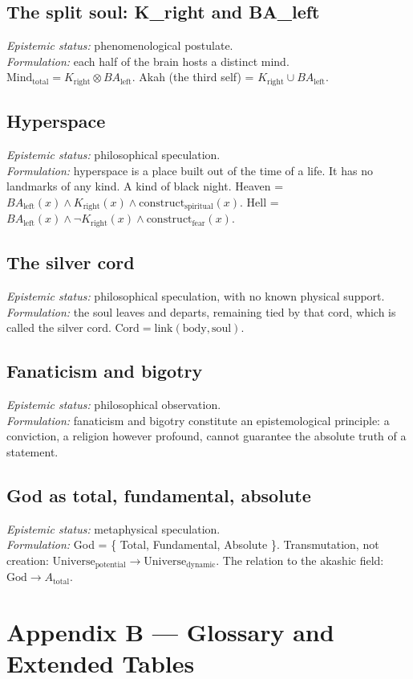 \subsection{The split soul: K\_right and BA\_left}
\textit{Epistemic status:} phenomenological postulate. \\
\textit{Formulation:} each half of the brain hosts a distinct mind. $\text{Mind}_{\text{total}} = K_{\text{right}} \otimes BA_{\text{left}}$. Akah (the third self) = $K_{\text{right}} \cup BA_{\text{left}}$.

\subsection{Hyperspace}
\textit{Epistemic status:} philosophical speculation. \\
\textit{Formulation:} hyperspace is a place built out of the time of a life. It has no landmarks of any kind. A kind of black night. Heaven = $BA_{\text{left}}(x) \land K_{\text{right}}(x) \land \text{construct}_{\text{spiritual}}(x)$. Hell = $BA_{\text{left}}(x) \land \neg K_{\text{right}}(x) \land \text{construct}_{\text{fear}}(x)$.

\subsection{The silver cord}
\textit{Epistemic status:} philosophical speculation, with no known physical support. \\
\textit{Formulation:} the soul leaves and departs, remaining tied by that cord, which is called the silver cord. $\text{Cord} = \text{link}(\text{body}, \text{soul})$.

\subsection{Fanaticism and bigotry}
\textit{Epistemic status:} philosophical observation. \\
\textit{Formulation:} fanaticism and bigotry constitute an epistemological principle: a conviction, a religion however profound, cannot guarantee the absolute truth of a statement.

\subsection{God as total, fundamental, absolute}
\textit{Epistemic status:} metaphysical speculation. \\
\textit{Formulation:} God = \{ Total, Fundamental, Absolute \}. Transmutation, not creation: $\text{Universe}_{\text{potential}} \to \text{Universe}_{\text{dynamic}}$. The relation to the akashic field: $\text{God} \to A_{\text{total}}$.

\section{Appendix B --- Glossary and Extended Tables}
